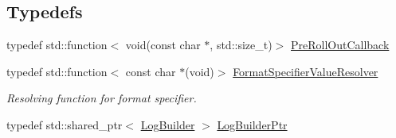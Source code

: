 \subsection*{Typedefs}
\begin{DoxyCompactItemize}
\item 
typedef std\+::function$<$ void(const char $\ast$, std\+::size\+\_\+t)$>$ \hyperlink{namespaceel_aeb764b890a6f3cd41d2726bcd4e9c0cf}{Pre\+Roll\+Out\+Callback}
\item 
typedef std\+::function$<$ const char $\ast$(void)$>$ \hyperlink{namespaceel_ab3cd18425a11df166a041d9024b8b5c6}{Format\+Specifier\+Value\+Resolver}
\begin{DoxyCompactList}\small\item\em Resolving function for format specifier. \end{DoxyCompactList}\item 
typedef std\+::shared\+\_\+ptr$<$ \hyperlink{classel_1_1_log_builder}{Log\+Builder} $>$ \hyperlink{namespaceel_ad4c4b2f7d70a4b02568a9f70724a6b39}{Log\+Builder\+Ptr}
\end{DoxyCompactItemize}
